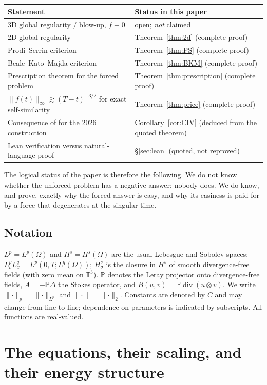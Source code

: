 \documentclass[11pt]{article}
\theoremstyle{remark}
\newcommand{\T}{\mathbb{T}}
\newcommand{\norm}[1]{\lVert #1\rVert}
\newcommand{\Div}{\operatorname{div}}
\newcommand{\Leray}{\mathbb{P}}
\begin{document}
\begin{center}
\begin{tabular}{@{}ll@{}}
\toprule
Statement & Status in this paper\\
\midrule
3D global regularity / blow-up, $f\equiv0$ & open; \emph{not} claimed\\
2D global regularity & Theorem~\ref{thm:2d} (complete proof)\\
Prodi--Serrin criterion & Theorem~\ref{thm:PS} (complete proof)\\
Beale--Kato--Majda criterion & Theorem~\ref{thm:BKM} (complete proof)\\
Prescription theorem for the forced problem & Theorem~\ref{thm:prescription} (complete proof)\\
$\norm{f(t)}_\infty\gtrsim(T-t)^{-3/2}$ for exact self-similarity
  & Theorem~\ref{thm:price} (complete proof)\\
Consequence of \cite{CIV2026} for the 2026 construction & Corollary~\ref{cor:CIV}
  (deduced from the quoted theorem)\\
Lean verification versus natural-language proof & \S\ref{sec:lean} (quoted, not reproved)\\
\bottomrule
\end{tabular}
\end{center}

The logical status of the paper is therefore the following. We do not know whether the
unforced problem has a negative answer; nobody does. We do know, and prove, exactly why the
forced answer is easy, and why its easiness is paid for by a force that degenerates at the
singular time.

\subsection{Notation}

$L^p=L^p(\Omega)$ and $H^s=H^s(\Omega)$ are the usual Lebesgue and Sobolev spaces;
$L^p_tL^q_x=L^p(0,T;L^q(\Omega))$; $H^s_\sigma$ is the closure in $H^s$ of smooth
divergence-free fields (with zero mean on $\T^3$). $\Leray$ denotes the Leray projector onto
divergence-free fields, $A=-\Leray\Delta$ the Stokes operator, and
$B(u,v)=\Leray\Div(u\otimes v)$. We write $\norm{\cdot}_p=\norm{\cdot}_{L^p}$ and
$\norm{\cdot}=\norm{\cdot}_2$. Constants are denoted by $C$ and may change from line to
line; dependence on parameters is indicated by subscripts. All functions are real-valued.

\section{The equations, their scaling, and their energy structure}\label{sec:scaling}
\end{document}
